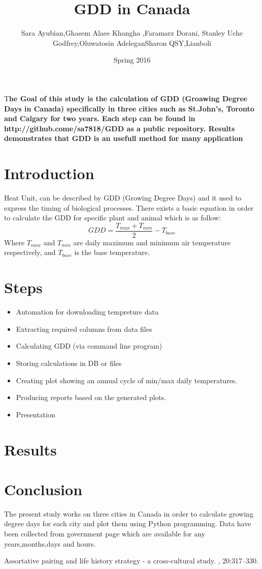 \documentclass[DIV=calc, paper=a4, fontsize=11pt, twocolumn]{scrartcl}
\title{GDD in Canada}
\author{Sara Ayubian\affmark[1],Ghasem Alaee Khangha \affmark[1],Faramarz Dorani\affmark[1],
Stanley Uche Godfrey\affmark[1],Oluwatosin Adelegan\affmark[1]
Sharon QSY\affmark[1],Lianboli\affmark[1]}
\date{Spring 2016}
\newcommand{\initial}[1]{ 
\lettrine[lines=3,lhang=0.3,nindent=0em]{
\color{DarkGoldenrod}
{\textsf{#1}}}{}}
\begin{document}
\maketitle 
\thispagestyle{fancy} 
\initial{T}\textbf{he Goal of this study is the calculation of GDD (Groawing Degree Days in Canada) specifically in three cities such as St.John's, Toronto and Calgary for two years. Each step can be found in http://github.come/sa7818/GDD as a public repository. Results demonstrates that GDD is an usefull method for many application}
\section{Introduction}
Heat Unit, can be described by GDD (Growing Degree Days) and it used to express the timing of biological processes. There exists a basic equation in order to calculate the GDD for specific plant and animal which is as follow:
\begin{equation}
GDD =\frac {T_{max}+T_{min}}{2}-T_{base}
\end{equation}
Where $T_{max}$ and $T_{min}$ are daily maximum and minimum air temperature respectively, and $T_{base}$ is the base temperature.
\section{Steps}
\begin{itemize}
\item Automation for downloading tempreture data
\item Extracting required columns from data files
\item Calculating GDD (via command line program)
\item Storing calculations in DB or files
\item Creating plot showing an annual cycle of min/max daily temperatures.
\item Producing reports based on the generated plots.
\item Presentation
\end{itemize}
\section{Results}
\section{Conclusion}
The present study works on three cities in Canada in order to calculate growing degree days for each city and plot them using Python programming. Data have been collected from government page which are available for any years,months,days and hours.
\begin{thebibliography}{99}
\newblock Assortative pairing and life history strategy - a cross-cultural
  study.
, 20:317--330.
 \end{thebibliography}
\end{document}
